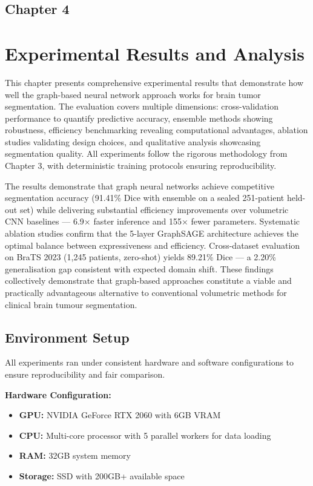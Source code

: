 \begin{center}
    \section*{\fontsize{20}{20}\selectfont Chapter 4}
\end{center}
\vspace{10mm}

\section{Experimental Results and Analysis}

This chapter presents comprehensive experimental results that demonstrate how well the graph-based neural network approach works for brain tumor segmentation. The evaluation covers multiple dimensions: cross-validation performance to quantify predictive accuracy, ensemble methods showing robustness, efficiency benchmarking revealing computational advantages, ablation studies validating design choices, and qualitative analysis showcasing segmentation quality. All experiments follow the rigorous methodology from Chapter 3, with deterministic training protocols ensuring reproducibility.

The results demonstrate that graph neural networks achieve competitive segmentation accuracy (91.41\% Dice with ensemble on a sealed 251-patient held-out set) while delivering substantial efficiency improvements over volumetric CNN baselines — 6.9$\times$ faster inference and 155$\times$ fewer parameters. Systematic ablation studies confirm that the 5-layer GraphSAGE architecture achieves the optimal balance between expressiveness and efficiency. Cross-dataset evaluation on BraTS 2023 (1,245 patients, zero-shot) yields 89.21\% Dice — a 2.20\% generalisation gap consistent with expected domain shift. These findings collectively demonstrate that graph-based approaches constitute a viable and practically advantageous alternative to conventional volumetric methods for clinical brain tumour segmentation.


\subsection{Environment Setup}

All experiments ran under consistent hardware and software configurations to ensure reproducibility and fair comparison.

\textbf{Hardware Configuration:}
\begin{itemize}
    \item \textbf{GPU:} NVIDIA GeForce RTX 2060 with 6GB VRAM
    \item \textbf{CPU:} Multi-core processor with 5 parallel workers for data loading
    \item \textbf{RAM:} 32GB system memory
    \item \textbf{Storage:} SSD with 200GB+ available space
\end{itemize}

